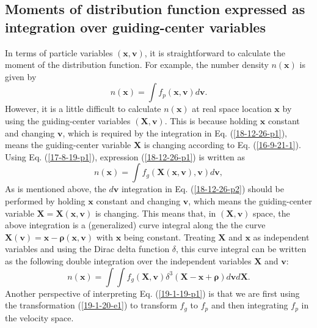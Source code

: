 \documentclass{llncs}
\newcommand{\tmmathbf}[1]{\ensuremath{\boldsymbol{#1}}}
\begin{document}
\subsection{Moments of distribution function expressed as integration over
guiding-center variables}

In terms of particle variables $(\mathbf{x}, \mathbf{v})$, it is
straightforward to calculate the moment of the distribution function. For
example, the number density $n (\mathbf{x})$ is given by
\begin{equation}
  \label{18-12-26-p1} n (\mathbf{x}) = \int f_p (\mathbf{x}, \mathbf{v})
  d\mathbf{v}.
\end{equation}
However, it is a little difficult to calculate $n (\mathbf{x})$ at real space
location $\mathbf{x}$ by using the guiding-center variables $(\mathbf{X},
\mathbf{v})$. This is because holding $\mathbf{x}$ constant and changing
$\mathbf{v}$, which is required by the integration in Eq. (\ref{18-12-26-p1}),
means the guiding-center variable $\mathbf{X}$ is changing according to Eq.
(\ref{16-9-21-1}). Using Eq. (\ref{17-8-19-p1}), expression
(\ref{18-12-26-p1}) is written as
\begin{equation}
  \label{18-12-26-p2} n (\mathbf{x}) = \int f_g (\mathbf{X} (\mathbf{x},
  \mathbf{v}), \mathbf{v}) d\mathbf{v},
\end{equation}
As is mentioned above, the $d\mathbf{v}$ integration in Eq.
(\ref{18-12-26-p2}) should be performed by holding $\mathbf{x}$ constant and
changing $\mathbf{v}$, which means the guiding-center variable
$\mathbf{X}=\mathbf{X} (\mathbf{x}, \mathbf{v})$ is changing. This means that,
in $(\mathbf{X}, \mathbf{v})$ space, the above integration is a (generalized)
curve integral along the the curve \ $\mathbf{X} (\mathbf{v})
=\mathbf{x}-\tmmathbf{\rho} (\mathbf{x}, \mathbf{v})$ with $\mathbf{x}$ being
constant. Treating $\mathbf{X}$ and $\mathbf{x}$ as independent variables and
using the Dirac delta function $\delta$, this curve integral can be written as
the following double integration over the independent variables $\mathbf{X}$
and $\mathbf{v}$:
\begin{equation}
  \label{19-1-19-p1} n (\mathbf{x}) = \int \int f_g (\mathbf{X}, \mathbf{v})
  \delta^3 (\mathbf{X}-\mathbf{x}+\tmmathbf{\rho}) d\mathbf{v}d\mathbf{X}.
\end{equation}
Another perspective of interpreting Eq. (\ref{19-1-19-p1}) is that we are
first using the transformation (\ref{19-1-20-e1}) to transform $f_g$ to $f_p$
and then integrating $f_p$ in the velocity space.
\end{document}

